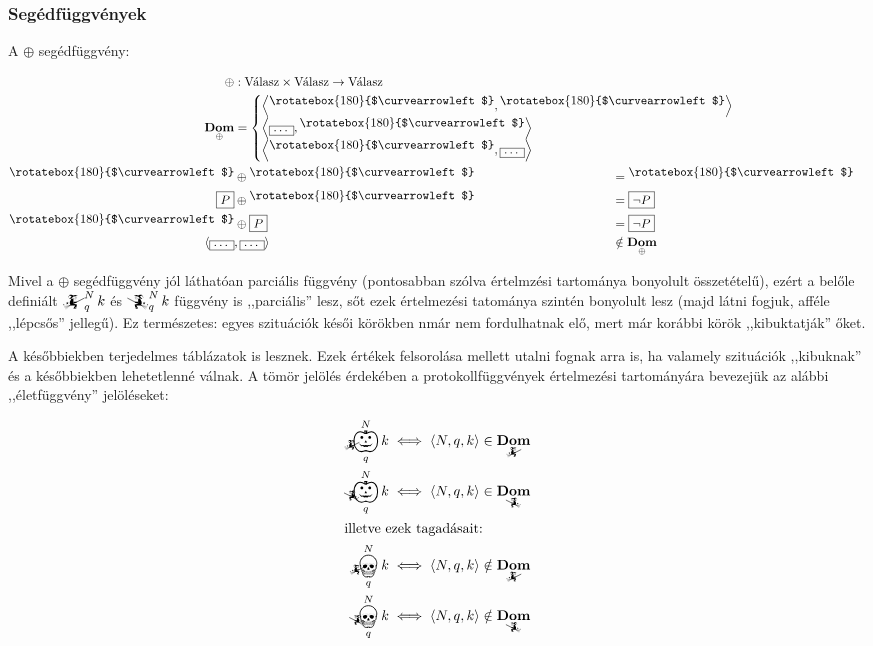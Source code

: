 \documentclass{article}
\newcommand{\nothing}{\text{\raisebox{0.4em}{\rotatebox{180}{$\curvearrowleft$}}}}%
\newcommand{\just}[1]{\boxed{#1}}%
\DeclareMathOperator{\dom}{\mathbf{Dom}}
\newcommand{\angled}[1]{\left\langle#1\right\rangle}
\newcommand{\mainfunA}[3]{\mathwitch_{#2}^{#1}#3}
\newcommand{\mainfunB}[3]{\reversemathwitch_{#2}^{#1}#3}
\newcommand{\nomainfunA}[3]{{}_{\mathwitch}\!\!\!\!\bigskull^{#1}_{#2}#3}
\newcommand{\nomainfunB}[3]{{}_{\reversemathwitch}\!\!\!\!\bigskull^{#1}_{#2}#3}
\newcommand{\yesmainfunA}[3]{{}_{\mathwitch}\!\!\!\!\bigpumpkin^{#1}_{#2}#3}
\newcommand{\yesmainfunB}[3]{{}_{\reversemathwitch}\!\!\!\!\bigpumpkin^{#1}_{#2}#3}
\begin{document}
	\subsubsection{Segédfüggvények}

	A $\oplus$ segédfüggvény:

	\begin{align*}
		\oplus &: \text{Válasz} \times \text{Válasz} \to \text{Válasz}\\
		\dom_\oplus &= \begin{cases}\angled{\nothing, \nothing}&\\\angled{\just\dots, \nothing}&\\\angled{\nothing, \just\dots}&\end{cases}\\
		\nothing   &\oplus \nothing            & &\mspace{-214mu}=  \nothing   \\
		\just P &\oplus \nothing            & &\mspace{-214mu}=  \just{\lnot P} \\
		\nothing   &\oplus \just P          & &\mspace{-214mu}=  \just{\lnot P} \\
		\langle\just\dots &, \just\dots\rangle & &\mspace{-214mu}\notin \dom_\oplus
	\end{align*}

	Mivel a $\oplus$ segédfüggvény jól láthatóan parciális függvény (pontosabban szólva értelmzési tartománya bonyolult összetételű), ezért a belőle definiált $\mainfunA Nqk$ és $\mainfunB Nqk$ függvény is ,,parciális'' lesz, sőt ezek értelmezési tatománya szintén bonyolult lesz (majd látni fogjuk, afféle ,,lépcsős'' jellegű). Ez természetes: egyes szituációk késői körökben nmár nem fordulhatnak elő, mert már korábbi körök ,,kibuktatják'' őket.

	A későbbiekben terjedelmes táblázatok is lesznek. Ezek értékek felsorolása mellett utalni fognak arra is, ha valamely szituációk ,,kibuknak'' és a későbbiekben lehetetlenné válnak. A tömör jelölés érdekében a protokollfüggvények értelmezési tartományára bevezejük az alábbi ,,életfüggvény'' jelöléseket:

	\begin{align}
		\yesmainfunA Nqk &\iff \angled{N,q,k}\in\dom_{\mathwitch} \\
		\yesmainfunB Nqk &\iff \angled{N,q,k}\in\dom_{\reversemathwitch} \\\intertext{illetve ezek tagadásait:}
		\nomainfunA  Nqk &\iff \angled{N,q,k}\notin\dom_{\mathwitch} \\
		\nomainfunB  Nqk &\iff \angled{N,q,k}\notin\dom_{\reversemathwitch}
	\end{align}
\end{document}

